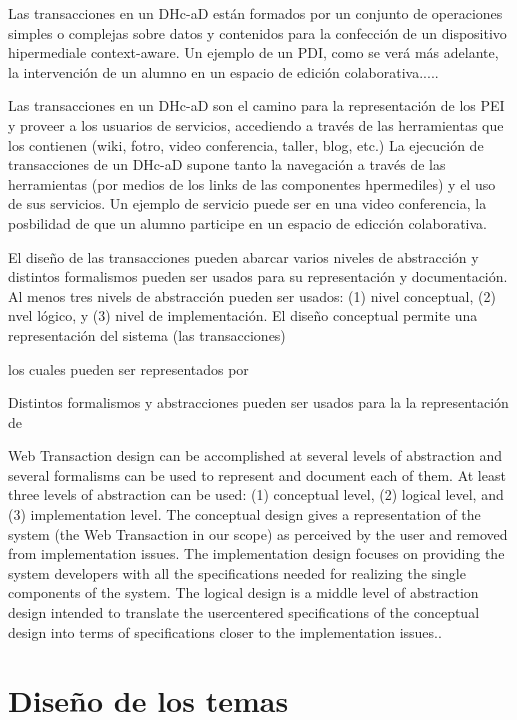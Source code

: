 \documentclass{llncs}
\begin{document}
Las transacciones en un DHc-aD  están formados por un conjunto de operaciones simples o complejas sobre datos y contenidos para la confección de un dispositivo hipermediale context-aware. Un ejemplo de un PDI, como se verá más adelante, la intervención de un alumno en un espacio de edición colaborativa.....

Las transacciones en un DHc-aD son el camino para la representación de los PEI y proveer a los usuarios de servicios, accediendo a través de las herramientas que los contienen (wiki, fotro, video conferencia, taller, blog, etc.) La ejecución de transacciones de un DHc-aD supone tanto la navegación a través de las herramientas (por medios de los links de las componentes hpermediles) y el uso de sus servicios. Un ejemplo de servicio puede ser en una video conferencia, la posbilidad de que un alumno participe en un espacio de edicción colaborativa.

El diseño de las transacciones pueden abarcar varios niveles de abstracción y distintos formalismos pueden ser usados para su representación y documentación. Al menos tres nivels de abstracción pueden ser usados: (1) nivel conceptual, (2) nvel lógico, y (3) nivel de implementación.  El diseño conceptual permite una representación del sistema (las transacciones) 


los cuales pueden ser representados por 



Distintos formalismos y abstracciones pueden ser usados para la la representación de 

Web Transaction design can be accomplished at several levels of
abstraction and several formalisms can be used to represent and
document each of them. At least three levels of abstraction can be
used: (1) conceptual level, (2) logical level, and (3)
implementation level. The conceptual design gives a
representation of the system (the Web Transaction in our scope)
as perceived by the user and removed from implementation
issues. The implementation design focuses on providing the
system developers with all the specifications needed for realizing
the single components of the system. The logical design is a
middle level of abstraction design intended to translate the usercentered
specifications of the conceptual design into terms of
specifications closer to the implementation issues..



\section{Diseño de los temas}
\end{document}
